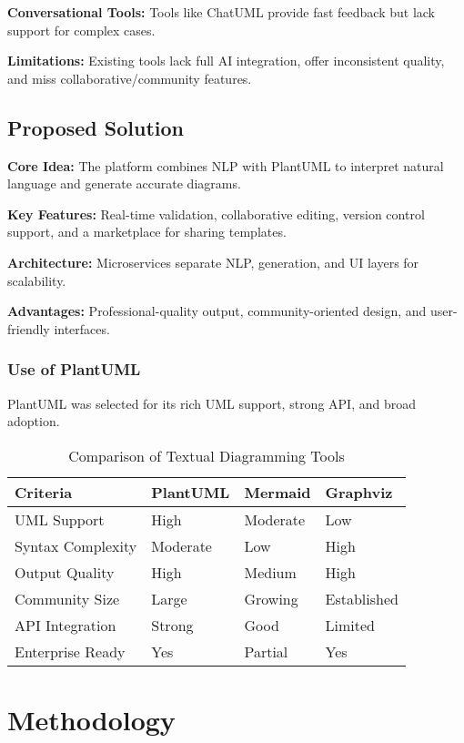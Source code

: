 \textbf{Conversational Tools:} Tools like ChatUML provide fast feedback but lack support for complex cases.

\textbf{Limitations:} Existing tools lack full AI integration, offer inconsistent quality, and miss collaborative/community features.

\subsection{Proposed Solution}

\textbf{Core Idea:} The platform combines NLP with PlantUML to interpret natural language and generate accurate diagrams.

\textbf{Key Features:} Real-time validation, collaborative editing, version control support, and a marketplace for sharing templates.

\textbf{Architecture:} Microservices separate NLP, generation, and UI layers for scalability.

\textbf{Advantages:} Professional-quality output, community-oriented design, and user-friendly interfaces.

\subsubsection{Use of PlantUML}

PlantUML was selected for its rich UML support, strong API, and broad adoption.

\begin{table}[htbp]
\centering
\caption{Comparison of Textual Diagramming Tools}
\label{tab:diagramming_tools}
\begin{tabular}{|p{2.5cm}|p{2.5cm}|p{2.5cm}|p{2.5cm}|}
\hline
\textbf{Criteria} & \textbf{PlantUML} & \textbf{Mermaid} & \textbf{Graphviz} \\
\hline
UML Support & High & Moderate & Low \\
Syntax Complexity & Moderate & Low & High \\
Output Quality & High & Medium & High \\
Community Size & Large & Growing & Established \\
API Integration & Strong & Good & Limited \\
Enterprise Ready & Yes & Partial & Yes \\
\hline
\end{tabular}
\end{table}

\section{Methodology}

